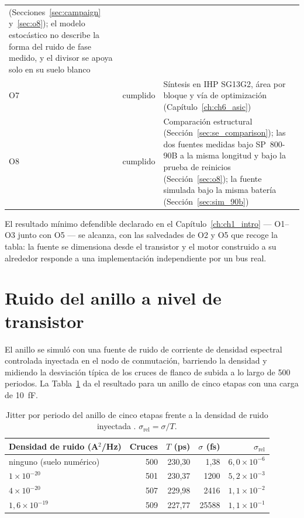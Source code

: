 \begin{table}[htbp]
\begin{tabular}{@{}llp{7.4cm}@{}}
              (Secciones~\ref{sec:campaign} y~\ref{sec:o8}); el modelo
              estocástico no describe la forma del ruido de fase medido, y
              el divisor se apoya solo en su suelo blanco \\
O7 & cumplido  & Síntesis en IHP SG13G2, área por bloque y vía de optimización
              (Capítulo~\ref{ch:ch6_asic}) \\
O8 & cumplido  & Comparación estructural (Sección~\ref{sec:se_comparison}); las
              dos fuentes medidas bajo SP~800-90B a la misma longitud y
              bajo la prueba de reinicios (Sección~\ref{sec:o8}); la fuente
              simulada bajo la misma batería (Sección~\ref{sec:sim_90b}) \\
\bottomrule
\end{tabular}
\end{table}

El resultado mínimo defendible declarado en el Capítulo~\ref{ch:ch1_intro} ---
O1--O3 junto con O5 --- se alcanza, con las salvedades de O2 y O5 que
recoge la tabla: la fuente se dimensiona desde el transistor y el motor construido
a su alrededor responde a una implementación independiente por un bus
real.

\section{Ruido del anillo a nivel de transistor}
\label{sec:spice_results}

El anillo se simuló con una fuente de ruido de corriente de densidad
espectral controlada inyectada en el nodo de conmutación, barriendo la
densidad y midiendo la desviación típica de los cruces de flanco de
subida a lo largo de 500 periodos. La Tabla~\ref{tab:spice} da el
resultado para un anillo de cinco etapas con una carga de 10~fF.

\begin{table}[htbp]
\centering
\caption{Jitter por periodo del anillo de cinco etapas frente a la densidad
de ruido inyectada \simu{}. $\sigma_{\mathrm{rel}} = \sigma/T$.}
\label{tab:spice}
\small
\begin{tabular}{@{}lrrrr@{}}
\toprule
Densidad de ruido (A$^2$/Hz) & Cruces & $T$ (ps) & $\sigma$ (fs) &
$\sigma_{\mathrm{rel}}$ \\
\midrule
ninguno (suelo numérico) & 500 & 230,30 & 1,38   & $6{,}0\times10^{-6}$ \\
$1\times10^{-20}$        & 501 & 230,37 & 1200   & $5{,}2\times10^{-3}$ \\
$4\times10^{-20}$        & 507 & 229,98 & 2416   & $1{,}1\times10^{-2}$ \\
$1{,}6\times10^{-19}$    & 509 & 227,77 & 25588  & $1{,}1\times10^{-1}$ \\
\bottomrule
\end{tabular}
\end{table}

